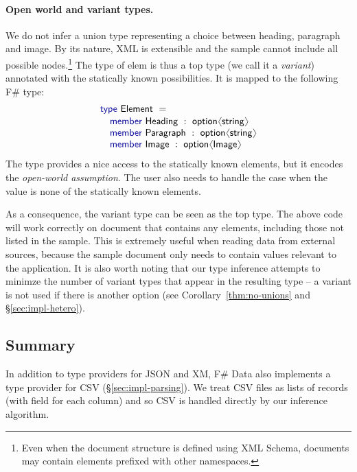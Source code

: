 \documentclass[10pt,preprint,blind,clearpagebib]{sigplanconf}
\newcommand{\langl}{\begin{picture}(4.5,7)
\put(1.1,2.5){\rotatebox{60}{\line(1,0){5.5}}}
\put(1.1,2.5){\rotatebox{300}{\line(1,0){5.5}}}
\end{picture}}
\newcommand{\rangl}{\begin{picture}(4.5,7)
\put(.9,2.5){\rotatebox{120}{\line(1,0){5.5}}}
\put(.9,2.5){\rotatebox{240}{\line(1,0){5.5}}}
\end{picture}}
\newcommand{\kvd}[1]{\textnormal{\textcolor{kvdclr}{\sffamily #1}}}
\newcommand{\ident}[1]{\textnormal{\sffamily #1}}
\begin{document}
\paragraph{Open world and variant types.}
We do not infer a union type representing a choice between heading, paragraph and image. By its 
nature, XML is extensible and the sample cannot include all possible nodes.\footnote{Even when the 
document structure is defined using XML Schema, documents may contain elements prefixed with other 
namespaces.} The type of \ident{elem} is thus a top type (we call it a \emph{variant}) annotated 
with the statically known possibilities. It is mapped to the following F\# type:
%
\begin{equation*}
\begin{array}{l}
 \kvd{type}~\ident{Element}~=  \\[0.1em]
 \quad \kvd{member}~\ident{Heading}~:~\ident{option}\langl \ident{string} \rangl\\
 \quad \kvd{member}~\ident{Paragraph}~:~\ident{option}\langl \ident{string} \rangl\\
 \quad \kvd{member}~\ident{Image}~:~\ident{option}\langl \ident{Image} \rangl\\
\end{array}
\end{equation*}
%
The type provides a nice access to the statically known elements, but it encodes the 
\emph{open-world assumption}. The user also needs to handle the case when the value is none 
of the statically known elements. 

As a consequence, the variant type can be seen as the top type. The above code will work
correctly on document that contains any elements, including those not listed in the sample. This
is extremely useful when reading data from external sources, because the sample document only
needs to contain values relevant to the application. It is also worth noting that our type 
inference attempts to minimze the number of variant types that appear in the resulting type --
a variant is not used if there is another option (see Corollary~\ref{thm:no-unions} and 
\S\ref{sec:impl-hetero}).


\subsection{Summary}
\label{sec:providers-sum}
In addition to type providers for JSON and XM, F\# Data also implements a type provider for CSV 
(\S\ref{sec:impl-parsing}). We treat CSV files as lists of records (with field for each column) 
and so CSV is handled directly by our inference algorithm.
\end{document}
